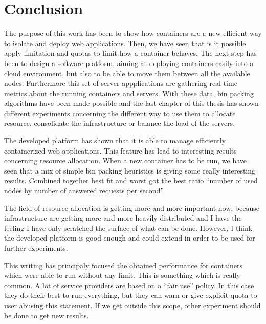 \chapter*{Conclusion}

The purpose of this work has been to show how containers are a new efficient
way to isolate and deploy web applications. Then, we have seen that is it
possible apply limitation and quotas to limit how a container behaves. The next
step has been to design a software platform, aiming at deploying containers
easily into a cloud environment, but also to be able to move them between all
the available nodes. Furthermore this set of server appplications are gathering
real time metrics about the running containers and servers. With these data,
bin packing algorithms have been made possible and the last chapter of this
thesis has shown different experiments concerning the different way to use them
to allocate resource, consolidate the infrastructure or balance the load of the
servers.
\vspace{1em}

The developed platform has shown that it is able to manage efficiently
containerized web applications. This feature has lead to interesting results
concerning resource allocation. When a new container has to be run, we have
seen that a mix of simple bin packing heuristics is giving some really
interesting results. Combined together best fit and worst got the best ratio
``number of used nodes by number of answered requests per second''
\vspace{1em}

The field of resource allocation is getting more and more important now,
because infrastructure are getting more and more heavily distributed and I
have the feeling I have only scratched the surface of what can be done.
However, I think the developed platform is good enough and could extend
in order to be used for further experiments.
\vspace{1em}

This writing has principaly focused the obtained performance for containers
which were able to run without any limit. This is something which is really
common. A lot of service providers are based on a ``fair use'' policy. In this
case they do their best to run everything, but they can warn or give explicit
quota to user abusing this statement. If we get outside this scope, other
experiment should be done to get new results.
\vspace{1em}


